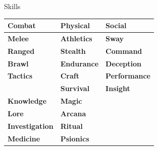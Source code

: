 \documentclass[10pt]{article}
\begin{document}
\begin{minipage}[t]{0.48\linewidth}
    \vspace{0.5em}
    
    \begin{charbox}{Skills}
        \begin{tabular}{>{\bfseries}p{2.5cm} >{\bfseries}p{2.5cm} >{\bfseries}p{2.5cm}}
            \toprule
            \textbf{Combat} & \textbf{Physical} & \textbf{Social}\\
            \midrule
            Melee & Athletics & Sway\\
            Ranged & Stealth & Command\\
            Brawl & Endurance & Deception\\
            Tactics & Craft & Performance\\
            & Survival & Insight\\
            \addlinespace
            \textbf{Knowledge} & \textbf{Magic} & \\
            Lore & Arcana & \\
            Investigation & Ritual & \\
            Medicine & Psionics & \\
            \bottomrule
        \end{tabular}
    \end{charbox}
\end{minipage}
\hfill
\end{document}

